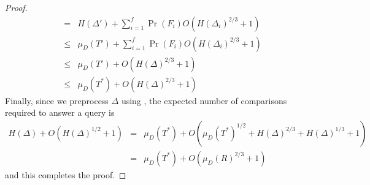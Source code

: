\documentclass[lotsofwhite]{patmorin}
\begin{document}
\begin{proof}
\begin{eqnarray*}
    &  =  & H(\Delta') + \sum_{i=1}^f\Pr(F_i) O(H(\Delta_i)^{2/3}+1) \\ 
    & \le & \mu_D(T') + \sum_{i=1}^f\Pr(F_i) O(H(\Delta_i)^{2/3}+1) \\ 
    & \le & \mu_D(T') + O(H(\Delta)^{2/3}+1) \\
    & \le & \mu_D(T^*) + O(H(\Delta)^{2/3}+1)
\end{eqnarray*}
Finally, since we preprocess $\Delta$ using , the
expected number of comparisons required to answer a query is
\begin{eqnarray*}
  H(\Delta) + O(H(\Delta)^{1/2} + 1)
   & = & \mu_D(T^*) +  O(\mu_D(T^*)^{1/2} + H(\Delta)^{2/3} + H(\Delta)^{1/3} + 1) \\
   & = & \mu_D(T^*) + O(\mu_D(R)^{2/3} + 1)
\end{eqnarray*}
and this completes the proof.
\end{proof}
\end{document}
